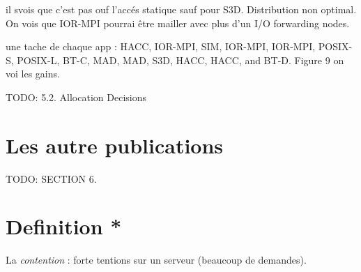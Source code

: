 \documentclass[10pt, a4paper]{article}
\begin{document}
il svois que c'est pas ouf l'accés statique sauf pour S3D. Distribution non optimal. On vois que IOR-MPI pourrai être mailler avec plus d'un I/O forwarding nodes.

une tache de chaque app : HACC, IOR-MPI, SIM, IOR-MPI, IOR-MPI, POSIX-S, POSIX-L, BT-C, MAD, MAD, S3D, HACC, HACC, and BT-D. Figure 9 on voi les gains.



TODO: 5.2. Allocation Decisions


\section{Les autre publications}

TODO: SECTION 6.

\section{Definition *}

La \emph{contention} : forte tentions sur un serveur (beaucoup de demandes).
\end{document}
